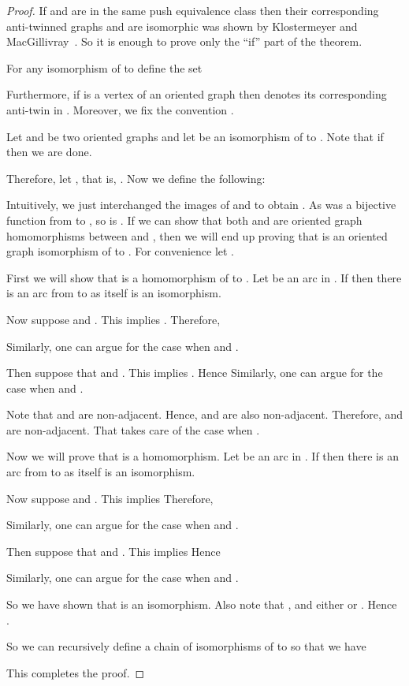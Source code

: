 \documentclass[10pt]{article}
\begin{document}
 
 \begin{proof}If  and   are in the same push equivalence class then 
 their corresponding anti-twinned graphs  and  are isomorphic was shown by Klostermeyer and MacGillivray~\cite{push}. So it is enough to prove only the ``if'' part of the theorem.
 
 
For any isomorphism  of  to  define the set 
 
Furthermore,  if  is a vertex of an oriented graph  then  denotes its corresponding anti-twin in . Moreover, we fix the convention .
 
 
 
 Let  and  be two oriented graphs and let  be an isomorphism of 
  to . Note that if  then we are done. 
 
 
 
 Therefore, let , that is,  . Now we define the following: 




Intuitively, we just interchanged the images of  and  to obtain . As  was a bijective function from  to , so is . 
If we can show that both  and  are oriented graph homomorphisms between  and , then we will 
end up proving that  is an oriented graph isomorphism of 
  to . For convenience let . 


First we will show  that  is a homomorphism of  to . Let  be an arc in 
. If  then there is an arc from  to  as  itself  
is an isomorphism. 

Now suppose  and . This implies . Therefore, 

Similarly, one can argue for the case when  and .

Then suppose that  and . 
This implies . 
Hence  
Similarly, one can argue for the case when  and .

Note that  and  are non-adjacent. Hence,  and  are also non-adjacent. Therefore,  and 
are non-adjacent. That takes care of the case when .

\medskip

Now we will prove that  is a homomorphism. 
Let  be an arc in 
.
If  then there is an arc from  to  as  itself  
is an isomorphism. 


Now suppose  and . 
This implies  
Therefore, 


Similarly, one can argue for the case when  and .

Then suppose that  and . 
This implies  
Hence 

Similarly, one can argue for the case when  and . 

\medskip

So we have shown that  is an isomorphism. Also note that ,  and either 
or . 
Hence . 

So we can recursively define a chain of isomorphisms 
 of  to   so that we have 

This completes the proof.
 \end{proof}
\end{document}
